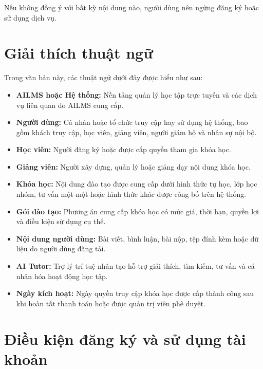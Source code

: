 \documentclass[12pt,a4paper]{article}
\begin{document}
Nếu không đồng ý với bất kỳ nội dung nào, người dùng nên ngừng đăng ký hoặc sử dụng dịch vụ.

\section{Giải thích thuật ngữ}

Trong văn bản này, các thuật ngữ dưới đây được hiểu như sau:

\begin{itemize}
    \item \textbf{AILMS hoặc Hệ thống:} Nền tảng quản lý học tập trực tuyến
    và các dịch vụ liên quan do AILMS cung cấp.

    \item \textbf{Người dùng:} Cá nhân hoặc tổ chức truy cập hay sử dụng hệ thống,
    bao gồm khách truy cập, học viên, giảng viên, người giám hộ và nhân sự nội bộ.

    \item \textbf{Học viên:} Người đăng ký hoặc được cấp quyền tham gia khóa học.

    \item \textbf{Giảng viên:} Người xây dựng, quản lý hoặc giảng dạy nội dung khóa học.

    \item \textbf{Khóa học:} Nội dung đào tạo được cung cấp dưới hình thức tự học,
    lớp học nhóm, tư vấn một-một hoặc hình thức khác được công bố trên hệ thống.

    \item \textbf{Gói đào tạo:} Phương án cung cấp khóa học có mức giá,
    thời hạn, quyền lợi và điều kiện sử dụng cụ thể.

    \item \textbf{Nội dung người dùng:} Bài viết, bình luận, bài nộp,
    tệp đính kèm hoặc dữ liệu do người dùng đăng tải.

    \item \textbf{AI Tutor:} Trợ lý trí tuệ nhân tạo hỗ trợ giải thích,
    tìm kiếm, tư vấn và cá nhân hóa hoạt động học tập.

    \item \textbf{Ngày kích hoạt:} Ngày quyền truy cập khóa học được cấp thành công
    sau khi hoàn tất thanh toán hoặc được quản trị viên phê duyệt.
\end{itemize}

\section{Điều kiện đăng ký và sử dụng tài khoản}
\end{document}
